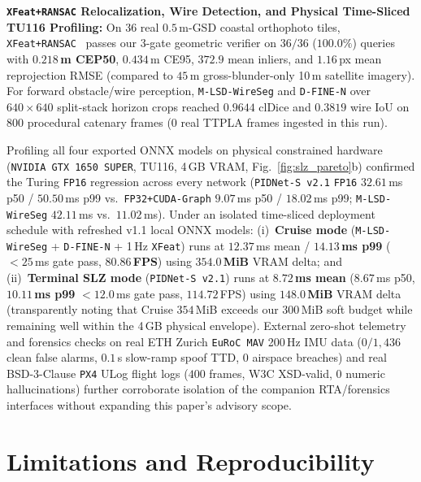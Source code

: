 \documentclass[10pt]{article}
\begin{document}
\textbf{\texttt{XFeat+RANSAC} Relocalization, Wire Detection, and Physical Time-Sliced TU116 Profiling:} On 36 real $0.5$\,m-GSD coastal orthophoto tiles, \texttt{XFeat+RANSAC}~\cite{potje_xfeat_2024} passes our 3-gate geometric verifier on $36/36$ ($100.0\%$) queries with \textbf{$0.218$\,m CEP50}, $0.434$\,m CE95, $372.9$ mean inliers, and $1.16$\,px mean reprojection RMSE (compared to $45$\,m gross-blunder-only 10\,m satellite imagery). For forward obstacle/wire perception, \texttt{M-LSD-WireSeg} and \texttt{D-FINE-N} over $640\times 640$ split-stack horizon crops reached $0.9644$ clDice and $0.3819$ wire IoU on $800$ procedural catenary frames ($0$ real TTPLA frames ingested in this run).

Profiling all four exported ONNX models on physical constrained hardware (\texttt{NVIDIA GTX~1650~SUPER}, TU116, 4\,GB VRAM, Fig.~\ref{fig:slz_pareto}b) confirmed the Turing \texttt{FP16} regression across every network (\texttt{PIDNet-S v2.1} \texttt{FP16} $32.61$\,ms p50 / $50.50$\,ms p99 vs.\ \texttt{FP32+CUDA-Graph} $9.07$\,ms p50 / $18.02$\,ms p99; \texttt{M-LSD-WireSeg} $42.11$\,ms vs.\ $11.02$\,ms). Under an isolated time-sliced deployment schedule with refreshed v1.1 local ONNX models: (i)~\textbf{Cruise mode} (\texttt{M-LSD-WireSeg} + \texttt{D-FINE-N} + 1\,Hz \texttt{XFeat}) runs at $12.37$\,ms mean / \textbf{$14.13$\,ms p99} ($<25$\,ms gate pass, \textbf{$80.86$\,FPS}) using \textbf{$354.0$\,MiB} VRAM delta; and (ii)~\textbf{Terminal SLZ mode} (\texttt{PIDNet-S v2.1}) runs at \textbf{$8.72$\,ms mean} ($8.67$\,ms p50, \textbf{$10.11$\,ms p99} $<12.0$\,ms gate pass, $114.72$\,FPS) using \textbf{$148.0$\,MiB} VRAM delta (transparently noting that Cruise $354$\,MiB exceeds our $300$\,MiB soft budget while remaining well within the 4\,GB physical envelope). External zero-shot telemetry and forensics checks on real ETH Zurich \texttt{EuRoC~MAV} 200\,Hz IMU data ($0/1{,}436$ clean false alarms, $0.1$\,s slow-ramp spoof TTD, $0$ airspace breaches) and real BSD-3-Clause \texttt{PX4} ULog flight logs ($400$ frames, W3C XSD-valid, $0$ numeric hallucinations) further corroborate isolation of the companion RTA/forensics interfaces without expanding this paper's advisory scope.

\section{Limitations and Reproducibility}
\label{sec:limitations}
\end{document}
